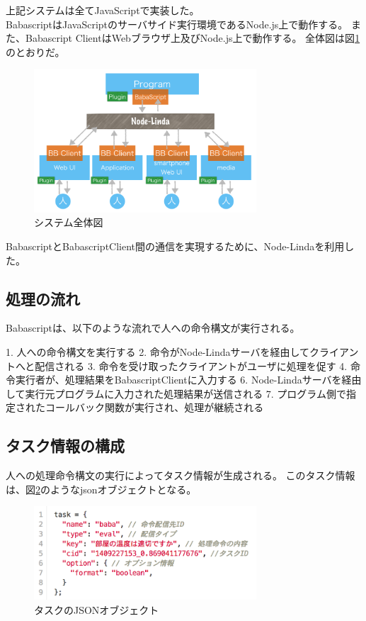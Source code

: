 \documentclass[twoside]{wiss}
\begin{document}
上記システムは全てJavaScriptで実装した。\\
BabascriptはJavaScriptのサーバサイド実行環境であるNode.js上で動作する。
また、Babascript ClientはWebブラウザ上及びNode.js上で動作する。
全体図は図\ref{system}のとおりだ。

\begin{figure}[h]
  \includegraphics[width=83mm, bb=0 0 928 599]{./images/system.png}
  \caption{システム全体図}  
  \label{system}
\end{figure}

BabascriptとBabascriptClient間の通信を実現するために、Node-Linda\cite{linda}を利用した。

\subsection{処理の流れ}

Babascriptは、以下のような流れで人への命令構文が実行される。

1. 人への命令構文を実行する
2. 命令がNode-Lindaサーバを経由してクライアントへと配信される
3. 命令を受け取ったクライアントがユーザに処理を促す
4. 命令実行者が、処理結果をBabascriptClientに入力する
6. Node-Lindaサーバを経由して実行元プログラムに入力された処理結果が送信される
7. プログラム側で指定されたコールバック関数が実行され、処理が継続される

\subsection{タスク情報の構成}

人への処理命令構文の実行によってタスク情報が生成される。
このタスク情報は、図\ref{task}のようなjsonオブジェクトとなる。

\begin{figure}[!h]
  \includegraphics[width=83mm, bb=0 0 755 318]{./images/task.png}
  \caption{タスクのJSONオブジェクト}  
  \label{task}
\end{figure}
\end{document}
